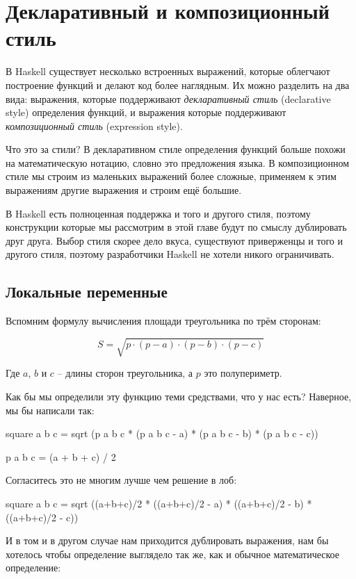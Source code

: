 \chapter{Декларативный и композиционный стиль}

В Haskell существует несколько встроенных выражений, которые облегчают
построение функций и делают код более наглядным. Их можно разделить на
два вида: выражения, которые поддерживают \emph{декларативный стиль}
(declarative style) определения функций, и выражения которые
поддерживают \emph{композиционный стиль} (expression style).

Что это за стили? В декларативном стиле определения функций больше
похожи на математическую нотацию, словно это предложения языка. В
композиционном стиле мы строим из маленьких выражений более сложные,
применяем к этим выражениям другие выражения и строим ещё большие.

В Haskell есть полноценная поддержка и того и другого стиля, поэтому
конструкции которые мы рассмотрим в этой главе будут по смыслу
дублировать друг друга. Выбор стиля скорее дело вкуса, существуют
приверженцы и того и другого стиля, поэтому разработчики Haskell не
хотели никого ограничивать.

\section{Локальные переменные}

Вспомним формулу вычисления площади треугольника по трём сторонам:

\[S = \sqrt{p \cdot (p - a) \cdot (p - b) \cdot (p - c)}\]

Где $a$, $b$ и $c$ -- длины сторон треугольника, а $p$ это полупериметр.

Как бы мы определили эту функцию теми средствами, что у нас есть?
Наверное, мы бы написали так:


\begin{code}
square a b c = sqrt (p a b c * (p a b c - a) * (p a b c - b) * (p a b c - c))

p a b c = (a + b + c) / 2
\end{code}

Согласитесь это не многим лучше чем решение в лоб:


\begin{code}
square a b c = sqrt ((a+b+c)/2 * ((a+b+c)/2 - a) * ((a+b+c)/2 - b) * ((a+b+c)/2 - c))
\end{code}

И в том и в другом случае нам приходится дублировать выражения, нам бы
хотелось чтобы определение выглядело так же, как и обычное
математическое определение:


